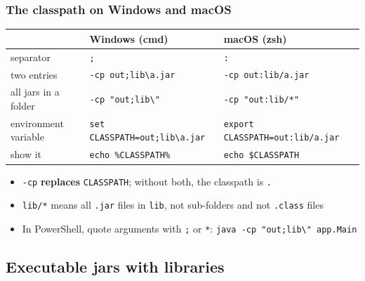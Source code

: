 \documentclass[aspectratio=169,10pt,compress]{beamer}
\begin{document}
\begin{frame}[t,fragile] \frametitle{The classpath on Windows and macOS}
  \small
  \begin{tabular}{@{}L{0.24\textwidth}L{0.33\textwidth}L{0.33\textwidth}@{}}
    \toprule
                         & \textbf{Windows (cmd)}                         & \textbf{macOS (zsh)} \\
    \midrule
    separator            & \texttt{;}                                     & \texttt{:} \\
    two entries          & \texttt{-cp out;lib\textbackslash a.jar}       & \texttt{-cp out:lib/a.jar} \\
    all jars in a folder & \texttt{-cp "out;lib\textbackslash *"}         & \texttt{-cp "out:lib/*"} \\
    environment variable & \texttt{set CLASSPATH=out;lib\textbackslash a.jar} & \texttt{export CLASSPATH=out:lib/a.jar} \\
    show it              & \texttt{echo \%CLASSPATH\%}                    & \texttt{echo \$CLASSPATH} \\
    \bottomrule
  \end{tabular}

  \vspace{0.5em}
  \begin{itemize}\small
    \item \texttt{-cp} \textbf{replaces} \texttt{CLASSPATH}; without both, the classpath is \texttt{.}
    \item \texttt{lib/*} means all \texttt{.jar} files in \texttt{lib}, not sub-folders and not \texttt{.class} files
    \item In PowerShell, quote arguments with \texttt{;} or \texttt{*}: \texttt{java -cp "out;lib\textbackslash *" app.Main}
  \end{itemize}
\end{frame}


\subsection[Exec]{Executable jars with libraries}
\end{document}
